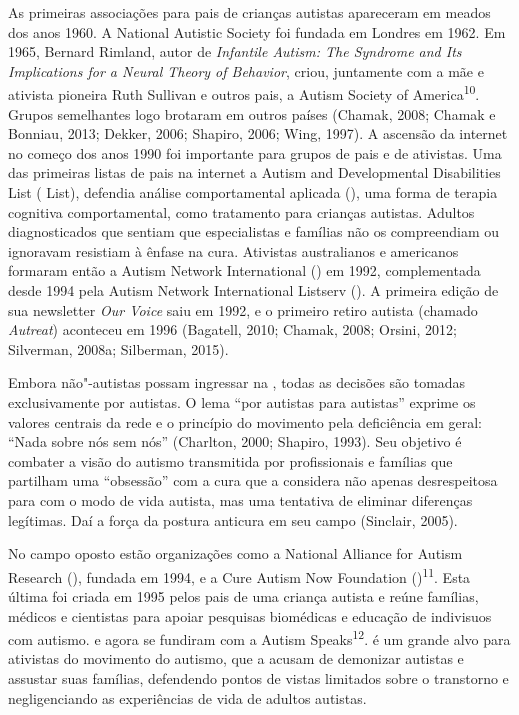 As primeiras associações para pais de crianças autistas apareceram em
meados dos anos 1960. A National Autistic Society foi fundada em Londres
em 1962. Em 1965, Bernard Rimland, autor de \emph{Infantile Autism: The
Syndrome and Its Implications for a Neural Theory of Behavior}, criou,
juntamente com a mãe e ativista pioneira Ruth Sullivan e outros pais, a
Autism Society of America\textsuperscript{10}. Grupos semelhantes logo
brotaram em outros países (Chamak, 2008; Chamak e Bonniau, 2013; Dekker,
2006; Shapiro, 2006; Wing, 1997). A ascensão da internet no começo dos
anos 1990 foi importante para grupos de pais e de ativistas. Uma das
primeiras listas de pais na internet a Autism and Developmental
Disabilities List ( List), defendia análise comportamental
aplicada (), uma forma de terapia cognitiva comportamental, como
tratamento para crianças autistas. Adultos diagnosticados que sentiam
que especialistas e famílias não os compreendiam ou ignoravam resistiam
à ênfase na cura. Ativistas australianos e americanos formaram então a
Autism Network International () em 1992, complementada desde 1994
pela Autism Network International Listserv (). A primeira edição de
sua newsletter \emph{Our Voice} saiu em 1992, e o primeiro retiro
autista (chamado \emph{Autreat}) aconteceu em 1996 (Bagatell, 2010;
Chamak, 2008; Orsini, 2012; Silverman, 2008a; Silberman, 2015).

Embora não"-autistas possam ingressar na , todas as decisões são
tomadas exclusivamente por autistas. O lema ``por autistas para
autistas'' exprime os valores centrais da rede e o princípio do
movimento pela deficiência em geral: ``Nada sobre nós sem nós''
(Charlton, 2000; Shapiro, 1993). Seu objetivo é combater a visão do
autismo transmitida por profissionais e famílias que partilham uma
``obsessão'' com a cura que a  considera não apenas desrespeitosa
para com o modo de vida autista, mas uma tentativa de eliminar
diferenças legítimas. Daí a força da postura anticura em seu campo
(Sinclair, 2005).

No campo oposto estão organizações como a National Alliance for Autism
Research (), fundada em 1994, e a Cure Autism Now Foundation
()\textsuperscript{11}. Esta última foi criada em 1995 pelos pais de
uma criança autista e reúne famílias, médicos e cientistas para apoiar
pesquisas biomédicas e educação de indivisuos com autismo.  e 
agora se fundiram com a Autism Speaks\textsuperscript{12}.  é um
grande alvo para ativistas do movimento do autismo, que a acusam de
demonizar autistas e assustar suas famílias, defendendo pontos de vistas
limitados sobre o transtorno e negligenciando as experiências de vida de
adultos autistas.

